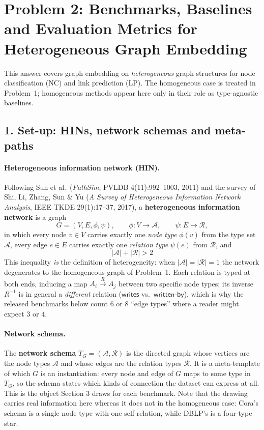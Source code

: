 \section*{Problem 2: Benchmarks, Baselines and Evaluation Metrics for
Heterogeneous Graph Embedding}

\noindent
This answer covers graph embedding on \emph{heterogeneous} graph structures for node
classification (NC) and link prediction (LP). The homogeneous case is treated in Problem~1;
homogeneous methods appear here only in their role as type-agnostic baselines.

\subsection*{1. Set-up: HINs, network schemas and meta-paths}

\paragraph{Heterogeneous information network (HIN).}
Following Sun et al.\ (\emph{PathSim}, PVLDB 4(11):992--1003, 2011) and the survey of Shi, Li,
Zhang, Sun \& Yu (\emph{A Survey of Heterogeneous Information Network Analysis}, IEEE TKDE
29(1):17--37, 2017), a \textbf{heterogeneous information network} is a graph
\[
  G=(V,E,\phi,\psi),\qquad \phi:V\to\mathcal{A},\qquad \psi:E\to\mathcal{R},
\]
in which every node $v\in V$ carries exactly one \emph{node type} $\phi(v)$ from the type set
$\mathcal{A}$, every edge $e\in E$ carries exactly one \emph{relation type} $\psi(e)$ from
$\mathcal{R}$, and
\[
  \boxed{\;|\mathcal{A}|+|\mathcal{R}|>2\;}
\]
This inequality \emph{is} the definition of heterogeneity: when $|\mathcal{A}|=|\mathcal{R}|=1$
the network degenerates to the homogeneous graph of Problem~1. Each relation is typed at both
ends, inducing a map $A_i\xrightarrow{R}A_j$ between two specific node types; its inverse
$R^{-1}$ is in general a \emph{different} relation ($\mathsf{writes}$ vs.\ $\mathsf{written\text{-}by}$),
which is why the released benchmarks below count $6$ or $8$ ``edge types'' where a reader might
expect $3$ or $4$.

\paragraph{Network schema.}
The \textbf{network schema} $T_G=(\mathcal{A},\mathcal{R})$ is the directed graph whose vertices
are the node types $\mathcal{A}$ and whose edges are the relation types $\mathcal{R}$. It is a
meta-template of which $G$ is an instantiation: every node and edge of $G$ maps to some type in
$T_G$, so the schema states which kinds of connection the dataset can express at all. This is the
object Section 3 draws for each benchmark. Note that the drawing carries real
information here whereas it does not in the homogeneous case: Cora's schema is a single node type
with one self-relation, while DBLP's is a four-type star.

